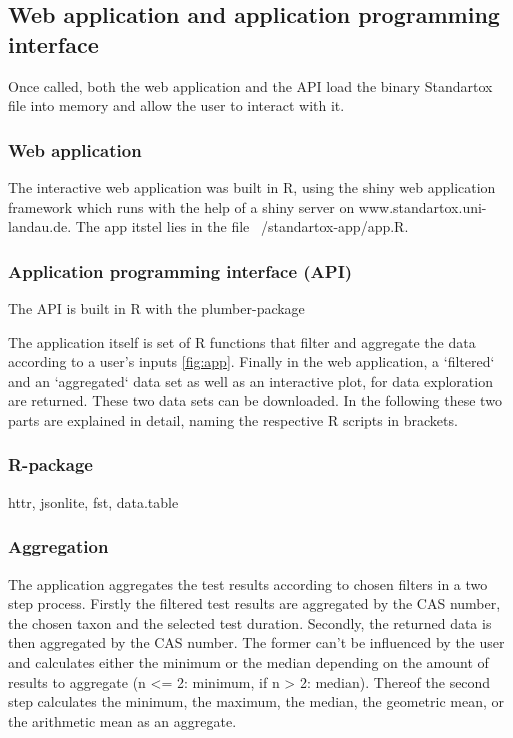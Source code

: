 \subsection*{Web application and application programming interface}

Once called, both the web application and the API load the binary Standartox file into memory and allow the user to interact with it. 

\subsubsection*{Web application}
The interactive web application was built in R, using the shiny web application framework \citep{chang_shiny_2018} which runs with the help of a shiny server \citep{HOW-TO-CITE-SHINY-SERVER} on www.standartox.uni-landau.de. The app itstel lies in the file ~/standartox-app/app.R.

\subsubsection*{Application programming interface (API)}
The API is built in R with the plumber-package \citep{}

The application itself is set of R functions that filter and aggregate the data according to a user's inputs \ref{fig:app}. Finally in the web application, a `filtered` and an `aggregated` data set as well as an interactive plot, for data exploration are returned. These two data sets can be downloaded. In the following these two parts are explained in detail, naming the respective R scripts in brackets.

\subsubsection*{R-package}

httr,
jsonlite,
fst,
data.table

\subsubsection*{Aggregation}
The \etoxbase{} application aggregates the test results according to chosen filters in a two step process. Firstly the filtered test results are aggregated by the CAS number, the chosen taxon and the selected test duration. Secondly, the returned data is then aggregated by the CAS number. The former can't be influenced by the user and calculates either the minimum or the median depending on the amount of results to aggregate (n <= 2: minimum, if n > 2: median). Thereof the second step calculates the minimum, the maximum, the median, the geometric mean, or the arithmetic mean as an aggregate. 

